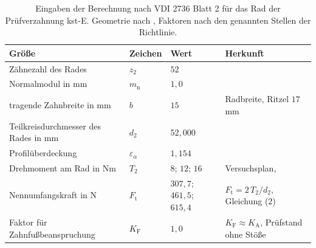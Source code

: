 \begin{table}[htbp]
	\caption{Eingaben der Berechnung nach VDI 2736 Blatt 2 für das Rad der Prüfverzahnung kst-E. Geometrie nach , Faktoren nach den genannten Stellen der Richtlinie.}
	\label{tab:vdi2736_eingaben}
	\centering
	\footnotesize
	\setlength{\tabcolsep}{4pt}
	\begin{tabular}{L{4.6cm}L{1.6cm}L{3.6cm}L{4.9cm}}
		Größe                                  & Zeichen                   & Wert                            & Herkunft                                                                              \\
		\hline
		Zähnezahl des Rades                    & $z_{\mathrm{2}}$          & $52$                            &                                                            \\
		\hline
		Normalmodul in mm                      & $m_{\mathrm{n}}$          & $1{,}0$                         &                                                            \\
		\hline
		tragende Zahnbreite in mm              & $b$                       & $15$                            & Radbreite, Ritzel $17$\,mm                                                            \\
		\hline
		Teilkreisdurchmesser des Rades in mm   & $d_{\mathrm{2}}$          & $52{,}000$                      &                                                            \\
		\hline
		Profilüberdeckung                      & $\varepsilon_{\alpha}$    & $1{,}154$                       &                                                            \\
		\hline
		Drehmoment am Rad in Nm                & $T_{\mathrm{2}}$          & $8$; $12$; $16$                 & Versuchsplan,                                                  \\
		\hline
		Nennumfangskraft in N                  & $F_{\mathrm{t}}$          & $307{,}7$; $461{,}5$; $615{,}4$ & $F_{\mathrm{t}} = 2\,T_{\mathrm{2}}/d_{\mathrm{2}}$, Gleichung (2) \cite{VDI2736-2}   \\
		\hline
		Faktor für Zahnfußbeanspruchung        & $K_{\mathrm{F}}$          & $1{,}0$                         & $K_{\mathrm{F}} \approx K_{\mathrm{A}}$, Prüfstand ohne Stöße \cite[S.~11]{VDI2736-2} \\

\end{tabular}
\end{table}
